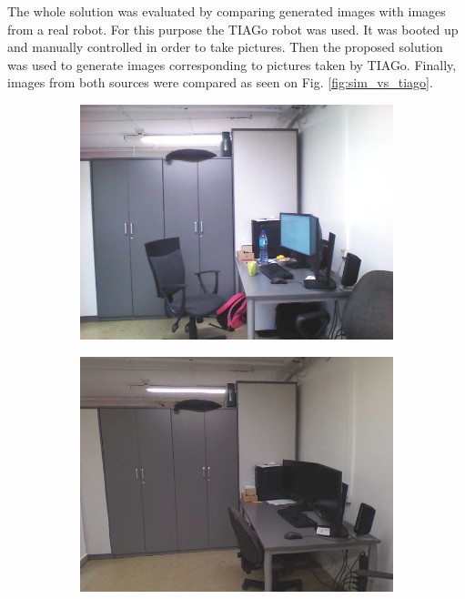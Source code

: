 \documentclass{svproc}
\begin{document}
The whole solution was evaluated by comparing generated images with images from a real robot.
For this purpose the TIAGo robot was used.
It was booted up and manually controlled in order to take pictures.
Then the proposed solution was used to generate images corresponding to pictures taken by TIAGo.
Finally, images from both sources were compared as seen on Fig. \ref{fig:sim_vs_tiago}.

\begin{figure}[!ht]
    \centering
    \begin{subfigure}{0.46\textwidth}
        \centering
        \includegraphics[width=\linewidth]{img/sim_vs_tiago/tia_biurko.jpg}
        \caption{}
        \vspace*{1em}
    \end{subfigure}\hfill%
    \begin{subfigure}{0.46\textwidth}
        \centering
        \includegraphics[width=\linewidth]{img/sim_vs_tiago/sim_biurko.jpg}

\end{subfigure}
\end{figure}
\end{document}
